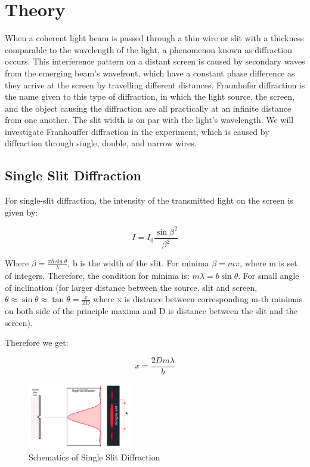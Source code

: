 
\vspace{-5mm}
\section{Theory}
	When a coherent light beam is passed through a thin wire or slit with a thickness comparable to the wavelength of the light, a phenomenon known as diffraction occurs. This interference pattern on a distant screen is caused by secondary waves from the emerging beam's wavefront, which have a constant phase difference as they arrive at the screen by travelling different distances. Fraunhofer diffraction is the name given to this type of diffraction, in which the light source, the screen, and the object causing the diffraction are all practically at an infinite distance from one another. The slit width is on par with the light's wavelength. We will investigate Franhouffer diffraction in the experiment, which is caused by diffraction through single, double, and narrow wires.

	\vspace{-5mm}
	\subsection{Single Slit Diffraction}
		For single-slit diffraction, the intensity of the transmitted light on the screen is given by:

		$$I = I_0 \frac{\sin\beta^2}{\beta^2}$$

		Where $\beta = \frac{\pi b\sin\theta}{\lambda}$, b is the width of the slit. For minima $\beta = m\pi$, where m is set of integers. Therefore, the condition for minima is: $m\lambda = b \sin\theta$. For small angle of inclination (for larger distance between the source, slit and screen, $\theta\approx\sin\theta\approx\tan\theta=\frac{x}{2D}$ where x is distance between corresponding m-th minimas on both side of the principle maxima and D is distance between the slit and the screen).

		\vspace{2cm}
		Therefore we get:

		\begin{equation}
			x = \frac{2Dm\lambda}{b}
			\label{eqn:1}
		\end{equation}

		\begin{figure}[H]
			\centering
			\includegraphics[width=0.4\textwidth]{images/single_slit.png}
			\caption{Schematics of Single Slit Diffraction}
			\label{fig:1}
		\end{figure}

